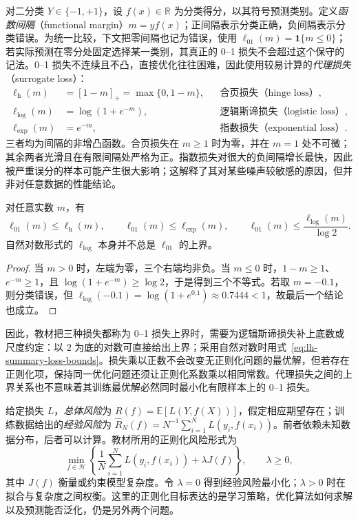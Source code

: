 对二分类 $Y\in\{-1,+1\}$，设 $f(x)\in\mathbb R$ 为分类得分，以其符号预测类别。定义\emph{函数间隔}（functional margin）$m=yf(x)$；正间隔表示分类正确，负间隔表示分类错误。为统一比较，下文把零间隔也记为错误，使用 $\ell_{01}(m)=\mathbf1\{m\leq0\}$；若实际预测在零分处固定选择某一类别，其真正的 0--1 损失不会超过这个保守的记法。0--1 损失不连续且不凸，直接优化往往困难，因此使用较易计算的\emph{代理损失}（surrogate loss）：
\begin{align}
\ell_{\mathrm h}(m)&=[1-m]_+=\max\{0,1-m\},
&&\text{合页损失（hinge loss）},\label{eq:lh-summary-hinge}\\
\ell_{\log}(m)&=\log(1+e^{-m}),
&&\text{逻辑斯谛损失（logistic loss）},\label{eq:lh-summary-logistic-loss}\\
\ell_{\exp}(m)&=e^{-m},
&&\text{指数损失（exponential loss）}.\label{eq:lh-summary-exp-loss}
\end{align}
三者均为间隔的非增凸函数。合页损失在 $m\geq1$ 时为零，并在 $m=1$ 处不可微；其余两者光滑且在有限间隔处严格为正。指数损失对很大的负间隔增长最快，因此被严重误分的样本可能产生很大影响；这解释了其对某些噪声较敏感的原因，但并非对任意数据的性能结论。

\begin{proposition}[代理损失与分类错误的上界]
\label{prop:lh-summary-loss-bounds}
对任意实数 $m$，有
\begin{equation}
\ell_{01}(m)\leq\ell_{\mathrm h}(m),\qquad
\ell_{01}(m)\leq\ell_{\exp}(m),\qquad
\ell_{01}(m)\leq\frac{\ell_{\log}(m)}{\log2}.
\label{eq:lh-summary-loss-bounds}
\end{equation}
自然对数形式的 $\ell_{\log}$ 本身并不总是 $\ell_{01}$ 的上界。
\end{proposition}
\begin{proof}
当 $m>0$ 时，左端为零，三个右端均非负。当 $m\leq0$ 时，$1-m\geq1$、$e^{-m}\geq1$，且 $\log(1+e^{-m})\geq\log2$，于是得到三个不等式。若取 $m=-0.1$，则分类错误，但 $\ell_{\log}(-0.1)=\log(1+e^{0.1})\approx0.7444<1$，故最后一个结论也成立。
\end{proof}

因此，教材把三种损失都称为 0--1 损失上界时，需要为逻辑斯谛损失补上底数或尺度约定：以 $2$ 为底的对数可直接给出上界；采用自然对数时用式~\eqref{eq:lh-summary-loss-bounds}。损失乘以正数不会改变无正则化问题的最优解，但若存在正则化项，保持同一优化问题还须让正则化系数乘以相同常数。代理损失之间的上界关系也不意味着其训练最优解必然同时最小化有限样本上的 0--1 损失。

给定损失 $L$，\emph{总体风险}为 $R(f)=\mathbb E[L(Y,f(X))]$，假定相应期望存在；训练数据给出的\emph{经验风险}为 $\widehat R_N(f)=N^{-1}\sum_{i=1}^N L(y_i,f(x_i))$。前者依赖未知数据分布，后者可以计算。教材所用的正则化风险形式为
\begin{equation}
\min_{f\in\mathcal H}\left\{
\frac1N\sum_{i=1}^N L(y_i,f(x_i))+\lambda J(f)\right\},
\qquad\lambda\geq0,
\label{eq:lh-summary-regularized-risk}
\end{equation}
其中 $J(f)$ 衡量或约束模型复杂度。令 $\lambda=0$ 得到经验风险最小化；$\lambda>0$ 时在拟合与复杂度之间权衡。这里的正则化目标表达的是学习策略，优化算法如何求解以及预测能否泛化，仍是另外两个问题。

